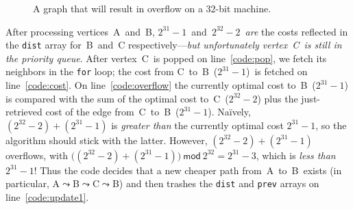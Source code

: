 \begin{figure}[t]
\centering
{}
\vspace*{-1em}
\caption{A graph that will result in overflow on a 32-bit machine.}
\label{fig:overflow}
\vspace*{-1.75em}
\end{figure}


After processing vertices~A~and~B, $2^{31}-1$~and~$2^{32}-2$~\emph{are} the costs reflected in the \texttt{dist} array for~B~and~C respectively---\emph{but unfortunately vertex~C~is still in the priority queue}.  After vertex~C~is popped on line~\ref{code:pop}, we fetch its neighbors in the \texttt{for} loop; the cost from C~to~B~($2^{31}-1$)~is fetched on line~\ref{code:cost}.  On line~\ref{code:overflow} the currently optimal cost to~B~($2^{31}-1$) is compared with the sum of the optimal cost to~C~($2^{32}-2$) plus the just-retrieved cost of the edge from~C~to~B~($2^{31}-1$).  Na\"ively, $(2^{32}-2)+(2^{31}-1)$ is \emph{greater than} the currently optimal cost $2^{31}-1$, so the algorithm should stick with the latter.  However, $(2^{32}-2)+(2^{31}-1)$ overflows, with $\big((2^{32}-2)+(2^{31}-1)\big)~\mathsf{mod}~2^{32}=2^{31}-3$, which is \emph{less than} $2^{31}-1$!
Thus the code decides that a new cheaper path from~A~to~B~exists (in particular, A$\leadsto$B$\leadsto$C$\leadsto$B) and then trashes the \texttt{dist} and \texttt{prev} arrays on line~\ref{code:update1}.



